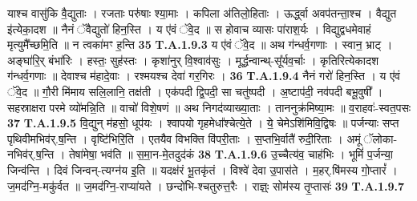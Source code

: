 \documentclass[17pt]{extarticle}
\begin{document}
                  याश्च वासु॑कि वै॒द्युताः । रजताः परु॑षाः श्या॒माः ।  कपिला अ॑तिलो॒हिताः । ऊर्द्ध्वा अवप॑तन्ता॒श्च । वैद्युत इ॑त्येका॒दश ॥ नैनं ॅवैद्युतो॑ हिन॒स्ति । य ए॑वं ॅवे॒द ॥ स होवाच व्यासः पा॑राश॒र्यः ।  विद्युद्वधमेवाहं मृत्युमै᳚च्छमि॒ति ॥  न त्वका॑मꣳ ह॒न्ति \textbf{ 35} \newline
                  \newline
                                                                  \textbf{ T.A.1.9.3} \newline
                  य ए॑वं ॅवे॒द ॥ अथ ग॑न्धर्व॒गणाः । स्वान॒ भ्राट् । अङ्घा॑रि॒र् बंभा॑रिः । हस्तः॒ सुह॑स्तः । कृशा॑नुर् वि॒श्वाव॑सुः । मूर्द्धन्वान्थ्-सू᳚र्यव॒र्चाः ।  कृतिरित्येकादश ग॑न्धर्व॒गणाः ॥ देवाश्च म॑हादे॒वाः । रश्मयश्च देवा॑ गर॒गिरः । \textbf{ 36} \newline
                  \newline
                                                                  \textbf{ T.A.1.9.4} \newline
                  नैनं गरो॑ हिन॒स्ति । य ए॑वं ॅवे॒द ॥ गौ॒री मि॑माय सलि॒लानि॒ तक्ष॑ती । एक॑पदी द्वि॒पदी॒ सा चतु॑ष्पदी । अ॒ष्टाप॑दी॒ नव॑पदी बभू॒वुषी᳚ । सहस्राक्षरा परमे व्यो॑मन्नि॒ति ॥ वाचो॑ विशे॒षणं ॥  अथ निगद॑व्याख्या॒ताः । ताननुक्र॑मिष्या॒मः ॥  व॒राहवः॑-स्वत॒पसः \textbf{ 37} \newline
                  \newline
                                                                  \textbf{ T.A.1.9.5} \newline
                  वि॒द्युन् म॑हसो॒ धूप॑यः । श्वापयो गृहमेधा᳚श्चेत्ये॒ते । ये॒ चेमेऽशि॑मिवि॒द्विषः ॥ पर्जन्याः सप्त पृथिवीमभिव॑र्.ष॒न्ति ।  वृष्टि॑भिरि॒ति । एतयैव विभक्ति वि॑परी॒ताः । स॒प्तभि॒र्वातै॑ रुदी॒रिताः । अमूं ॅलोका-नभिव॑र्.ष॒न्ति । तेषा॑मेषा॒ भव॑ति ॥ स॒मा॒न-मे॒तदुद॑कं \textbf{ 38} \newline
                  \newline
                                                                  \textbf{ T.A.1.9.6} \newline
                  उ॒च्चैत्य॑व॒ चाह॑भिः । भूमिं॑ प॒र्जन्या॒ जिन्व॑न्ति ।  दिवं जिन्वन्-त्यग्न॑य इ॒ति ॥ यदक्ष॑रं भू॒तकृ॑तं ।  विश्वे॑ देवा उ॒पास॑ते । म॒हर्.षि॑मस्य गो॒प्तारं᳚ । ज॒मद॑ग्नि॒-मकु॑र्वत ॥ ज॒मद॑ग्नि॒-राप्या॑यते । छन्दो॑भि-श्चतुरुत्त॒रैः । राज्ञ्ः॒ सोम॑स्य तृ॒प्तासः॑ \textbf{ 39} \newline
                  \newline
                                                                  \textbf{ T.A.1.9.7} \newline
\end{document}
